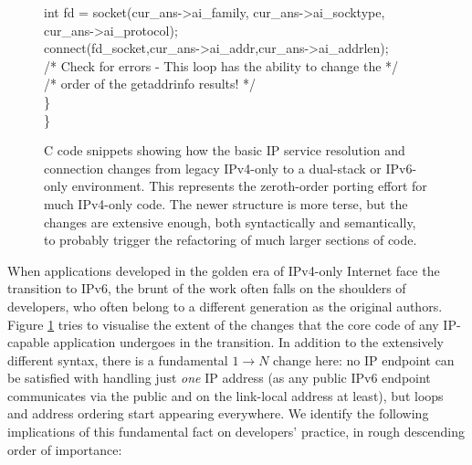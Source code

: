 \begin{figure}
\begin{framed}
{\qquad\qquad int fd = socket(cur\_ans->ai\_family, cur\_ans->ai\_socktype,\\
\qquad\qquad\qquad cur\_ans->ai\_protocol);\\
\qquad\qquad connect(fd\_socket,cur\_ans->ai\_addr,cur\_ans->ai\_addrlen);\\
\qquad\qquad /* Check for errors - This loop has the ability to change the */\\
\qquad\qquad /* order of the getaddrinfo results! */\\
\qquad \}\\
\}
}
\end{framed}
\caption{C code snippets showing how the basic IP service resolution and connection 
 changes from legacy IPv4-only to a dual-stack or IPv6-only environment. This represents
 the zeroth-order porting effort for much IPv4-only code. The newer structure
 is more terse, but the changes are extensive enough, both syntactically and
 semantically, to probably trigger the refactoring of much larger sections of code.}
\label{fig:pseudocode}
\end{figure}
When applications developed in the golden
era of IPv4-only Internet face the transition to IPv6, the brunt of the
work often falls on the shoulders of developers, who often belong to a different
generation as the original authors. Figure \ref{fig:pseudocode} tries to
visualise the extent of the changes that the core code of any
IP-capable application undergoes in the transition. In addition to
the extensively different syntax, there is a
fundamental $1\rightarrow N$ change here:
no IP endpoint can be satisfied with handling just {\it one}
IP address (as any public IPv6 endpoint communicates via the
public and on the link-local address at least), but loops and address
ordering start appearing everywhere. We identify the following implications of this
fundamental fact on developers' practice, in rough descending order
of importance:
